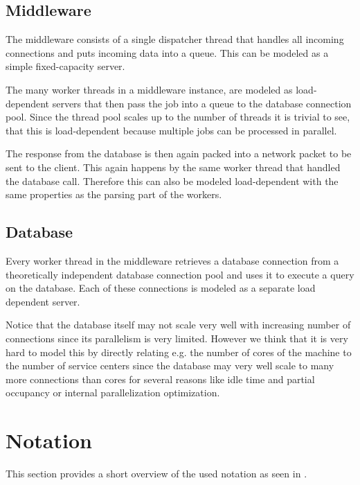 \documentclass[a4paper, oneside]{csthesis}
\begin{document}
\subsection{Middleware}
    The middleware consists of a single dispatcher thread that handles all
    incoming connections and puts incoming data into a queue. This can be
    modeled as a simple fixed-capacity server.
    
    The many worker threads in a \telesto{} middleware instance, are modeled as
    load-dependent servers that then pass the job into a queue to the database
    connection pool. Since the thread pool scales up to the number of threads it
    is trivial to see, that this is load-dependent because multiple jobs can be
    processed in parallel.
    
    The response from the database is then again packed into a \telesto{}
    network packet to be sent to the client. This again happens by the same
    worker thread that handled the database call. Therefore this can also be
    modeled load-dependent with the same properties as the parsing part of the
    workers.
    
\subsection{Database}
    Every worker thread in the middleware retrieves a database connection from
    a theoretically independent database connection pool and uses it to execute
    a query on the database. Each of these connections is modeled as a separate
    load dependent server.
    
    Notice that the database itself may not scale very well with increasing
    number of connections since its parallelism is very limited. However we
    think that it is very hard to model this by directly relating e.g. the
    number of cores of the machine to the number of service centers since the
    database may very well scale to many more connections than cores for several
    reasons like idle time and partial occupancy or internal parallelization
    optimization.
    
\section{Notation}

    This section provides a short overview of the used notation as seen in
    \cite{jain2008art}.
\end{document}
